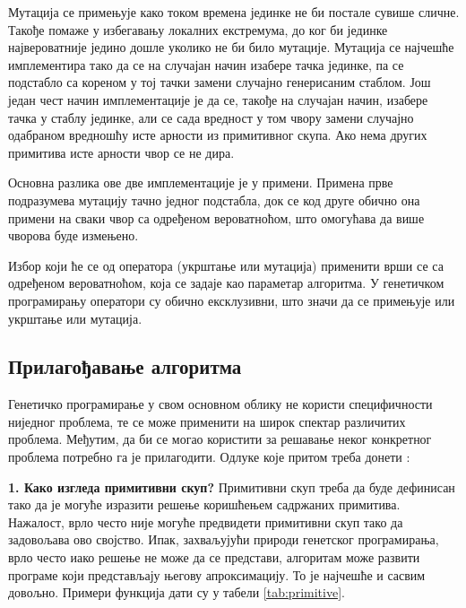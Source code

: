 \documentclass[a4paper]{article}
\begin{document}
Мутација се примењује како током времена јединке не би постале сувише сличне. Такође помаже у избегавању локалних екстремума, до ког би јединке највероватније једино дошле уколико не би било мутације.
Мутација се најчешће имплементира тако да се на случајан начин изабере тачка јединке, па се подстабло са кореном у тој тачки замени случајно генерисаним стаблом. Још један чест начин имплементације је да се, такође на случајан начин, изабере тачка у стаблу јединке, али се сада вредност у том чвору замени случајно одабраном вредношћу исте арности из примитивног скупа. Ако нема других примитива исте арности чвор се не дира. 

Основна разлика ове две имплементације је у примени. Примена прве подразумева мутацију тачно једног подстабла, док се код друге обично она примени на сваки чвор са одређеном вероватноћом, што омогућава да више чворова буде измењено. \newline

Избор који ће се од оператора (укрштање или мутација) применити врши се са одређеном вероватноћом, која се задаје као параметар алгоритма. У генетичком програмирању оператори су обично ексклузивни, што значи да се примењује или укрштање или мутација.

\subsection{Прилагођавање алгоритма}

Генетичко програмирање у свом основном облику не користи специфичности ниједног проблема, те се може применити на широк спектар различитих проблема. Међутим, да би се могао користити за решавање неког конкретног проблема потребно га је прилагодити. Одлуке које притом треба донети \cite{fieldGuidetoGP}:\newline

\textbf{1. Како изгледа примитивни скуп?}\newline
Примитивни скуп треба да буде дефинисан тако да је могуће изразити решење коришћењем садржаних примитива. Нажалост, врло често није могуће предвидети примитивни скуп тако да задовољава ово својство. Ипак, захваљујући природи генетског програмирања, врло често иако решење не може да се представи, алгоритам може развити програме који представљају његову апроксимацију. То је најчешће и сасвим довољно. Примери функција дати су у табели \ref{tab:primitive}. \newline
    
\end{document}
